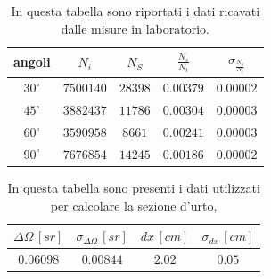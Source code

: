 \begin{table}[H]
    \centering
    \begin{tabular}{|c|c|c|c|c|}
    \hline
       angoli& $N_i$ & $N_S$ & $\frac{N_s}{N_i}$ & $\sigma_{\frac{N_s}{N_i}}$\\
       \hline
       \hline
       $30^\circ$ & $7500140$ & $28398$ & $0.00379$ & $0.00002$\\
        \hline
       $45^\circ$ & $3882437$ & $11786$ & $0.00304$ & $0.00003$\\
       \hline
       $60^\circ$ & $3590958$ & $8661$ & $0.00241$ & $0.00003$\\
       \hline
       $90^\circ$ & $7676854$ & $14245$ & $0.00186$ & $0.00002$\\
       \hline
    \end{tabular}
    \caption{In questa tabella sono riportati i dati ricavati dalle misure in laboratorio.}
    \label{tabella dati}
\end{table}
\begin{table}[H]
    \centering
    \begin{tabular}{|c|c|c|c|}
    \hline
       $\Delta \Omega\,[\unit{sr}]$& $\sigma_{\Delta \Omega}\,[\unit{sr}]$ & $dx\,[\unit{cm}]$ & $\sigma_{dx}\,[\unit{cm}]$ \\
       \hline
       \hline
       $0.06098$ & $0.00844$ & $2.02$ & $0.05$\\
       \hline
    \end{tabular}
    \caption{In questa tabella sono presenti i dati utilizzati per calcolare la sezione d'urto,}
    \label{tabella}
\end{table}